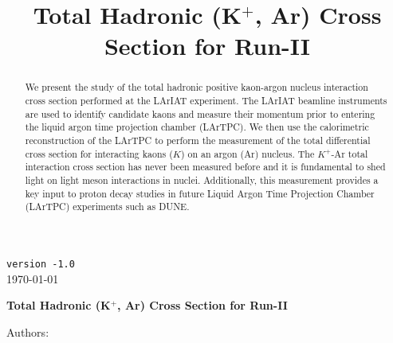 \documentclass[a4paper]{article}
\title{Total Hadronic  (K$^+$, Ar) Cross Section for Run-II}
\begin{document}
\def\Journal#1#2#3#4{{#1} {\bf #2}, #3 (#4)}
\def\etal{{\it et\ al.}}
\def\numunue{\nu_\mu\rightarrow\nu_e}
\def\numunutau{\nu_\mu\rightarrow\nu_\tau}
\def\nuebar{\bar\nu_e}
\def\nue{\nu_e}
\def\nutau{\nu_\tau}
\def\numubar{\bar\nu_\mu}
\def\numu{\nu_\mu}
\def\ra{\rightarrow}
\def\numubarnuebar{\bar\nu_\mu\rightarrow\bar\nu_e}
\def\nuebarnumubar{\bar\nu_e\rightarrow\bar\nu_\mu}
\def\osc{\rightsquigarrow}
\def\inteni{{\cal I}_{pot}}
\def\fmerit{{\cal F}}
\begin{flushright}
{\tt version -1.0}\\ 
\today
\end{flushright}
\vspace*{0.6cm}
\begin{center}
{\Large \bf Total Hadronic  (K$^+$, Ar) Cross Section for Run-II} 
\vspace*{1.6cm}
\setcounter{footnote}{0}  
\def\A{\kern+.6ex\lower.42ex\hbox{$\scriptstyle \iota$}\kern-1.20ex a}
\def\E{\kern+.5ex\lower.42ex\hbox{$\scriptstyle \iota$}\kern-1.10ex e}
\small
\newcommand{\Aname}[2]{#1}
\def\titlefoot#1{\vspace{-0.3cm}\begin{center}{\bf #1}\end{center}}

Authors: %

\end{center}
\vspace*{1cm}


\begin{abstract}

We present the study of the total hadronic positive kaon-argon nucleus interaction cross section performed at the LArIAT experiment. The LArIAT beamline instruments are used to identify candidate kaons and measure their momentum prior to entering the liquid argon time projection chamber (LArTPC). We then use the calorimetric reconstruction of the LArTPC to perform the measurement of the total differential cross section for interacting kaons ($K$) on an argon (Ar) nucleus. The $K^+$-Ar total interaction cross section has never been measured before and it is fundamental to shed light on light meson interactions in nuclei. Additionally, this measurement provides a key input to proton decay studies in future Liquid Argon Time Projection Chamber (LArTPC) experiments such as DUNE.

\end{abstract} 
\end{document}
